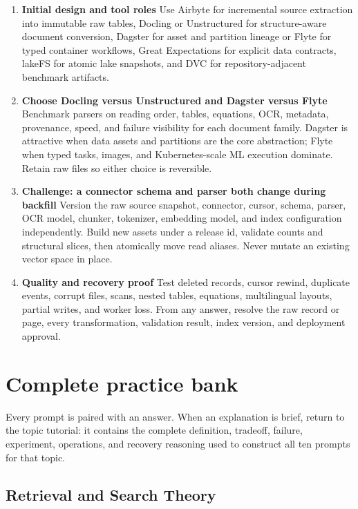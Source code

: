 \begin{enumerate}
\item \textbf{Initial design and tool roles} Use Airbyte for incremental source extraction into immutable raw tables, Docling or Unstructured for structure-aware document conversion, Dagster for asset and partition lineage or Flyte for typed container workflows, Great Expectations for explicit data contracts, lakeFS for atomic lake snapshots, and DVC for repository-adjacent benchmark artifacts.
\item \textbf{Choose Docling versus Unstructured and Dagster versus Flyte} Benchmark parsers on reading order, tables, equations, OCR, metadata, provenance, speed, and failure visibility for each document family. Dagster is attractive when data assets and partitions are the core abstraction; Flyte when typed tasks, images, and Kubernetes-scale ML execution dominate. Retain raw files so either choice is reversible.
\item \textbf{Challenge: a connector schema and parser both change during backfill} Version the raw source snapshot, connector, cursor, schema, parser, OCR model, chunker, tokenizer, embedding model, and index configuration independently. Build new assets under a release id, validate counts and structural slices, then atomically move read aliases. Never mutate an existing vector space in place.
\item \textbf{Quality and recovery proof} Test deleted records, cursor rewind, duplicate events, corrupt files, scans, nested tables, equations, multilingual layouts, partial writes, and worker loss. From any answer, resolve the raw record or page, every transformation, validation result, index version, and deployment approval.
\end{enumerate}
\clearpage\section{Complete practice bank}
Every prompt is paired with an answer. When an explanation is brief, return to the topic tutorial: it contains the complete definition, tradeoff, failure, experiment, operations, and recovery reasoning used to construct all ten prompts for that topic.
\subsection{Retrieval and Search Theory}
